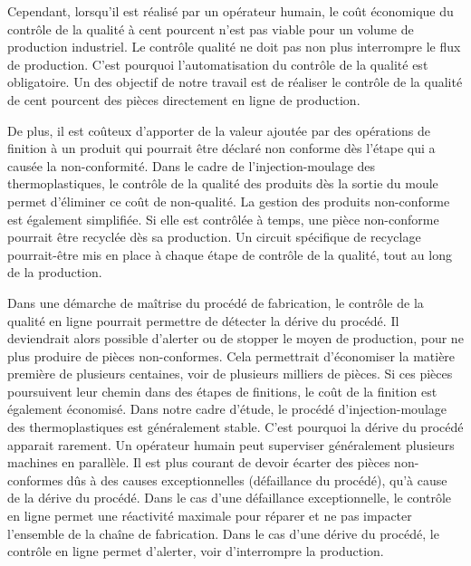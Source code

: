 Cependant, lorsqu'il est réalisé par un opérateur humain, le coût économique du contrôle de la qualité à cent pourcent n'est pas viable pour un volume de production industriel.
Le contrôle qualité ne doit pas non plus interrompre le flux de production.
C'est pourquoi l'automatisation du contrôle de la qualité est obligatoire.
Un des objectif de notre travail est de réaliser le contrôle de la qualité de cent pourcent des pièces directement en ligne de production.

De plus, il est coûteux d'apporter de la valeur ajoutée par des opérations de finition à un produit qui pourrait être déclaré non conforme dès l'étape qui a causée la non-conformité.
Dans le cadre de l'injection-moulage des thermoplastiques, le contrôle de la qualité des produits dès la sortie du moule permet d'éliminer ce coût de non-qualité.
La gestion des produits non-conforme est également simplifiée.  %
Si elle est contrôlée à temps, une pièce non-conforme pourrait être recyclée dès sa production.
Un circuit spécifique de recyclage pourrait-être mis en place à chaque étape de contrôle de la qualité, tout au long de la production.

Dans une démarche de maîtrise du procédé de fabrication, le contrôle de la qualité en ligne pourrait permettre de détecter la dérive du procédé.
Il deviendrait alors possible d'alerter ou de stopper le moyen de production, pour ne plus produire de pièces non-conformes.
Cela permettrait d'économiser la matière première de plusieurs centaines, voir de plusieurs milliers de pièces.
Si ces pièces poursuivent leur chemin dans des étapes de finitions, le coût de la finition est également économisé.
Dans notre cadre d'étude, le procédé d'injection-moulage des thermoplastiques est généralement stable.
C'est pourquoi la dérive du procédé apparait rarement.
Un opérateur humain peut superviser généralement plusieurs machines en parallèle.
Il est plus courant de devoir écarter des pièces non-conformes dûs à des causes exceptionnelles (défaillance du procédé), qu'à cause de la dérive du procédé.
Dans le cas d'une défaillance exceptionnelle, le contrôle en ligne permet une réactivité maximale pour réparer et ne pas impacter l'ensemble de la chaîne de fabrication.
Dans le cas d'une dérive du procédé, le contrôle en ligne permet d'alerter, voir d'interrompre la production.

